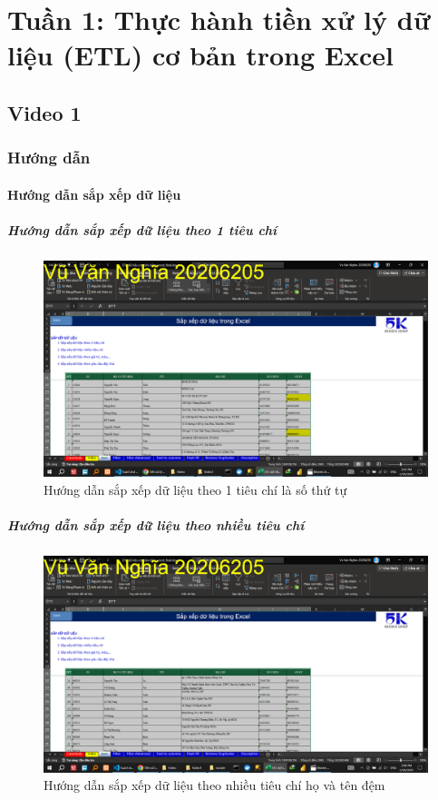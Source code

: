 \documentclass{article}
\begin{document}
\listoffigures
\newpage
\section{Tuần 1: Thực hành tiền xử lý dữ liệu (ETL) cơ bản trong Excel}
\subsection{Video 1}
\subsubsection{Hướng dẫn}
\paragraph{Hướng dẫn sắp xếp dữ liệu}
\subparagraph{Hướng dẫn sắp xếp dữ liệu theo 1 tiêu chí}

\begin{center}
    \begin{figure}[h]
        \centering
        \includegraphics[scale = 0.15]{Video1/HuongDan/1.png}
        \caption{Hướng dẫn sắp xếp dữ liệu theo 1 tiêu chí là số thứ tự}
    \end{figure}
\end{center}

\subparagraph{Hướng dẫn sắp xếp dữ liệu theo nhiều tiêu chí}

\begin{figure}[h]
    \centering
    \includegraphics[scale = 0.15]{Video1/HuongDan/2.png}
    \caption{Hướng dẫn sắp xếp dữ liệu theo nhiều tiêu chí họ và tên đệm}
\end{figure}
\end{document}
